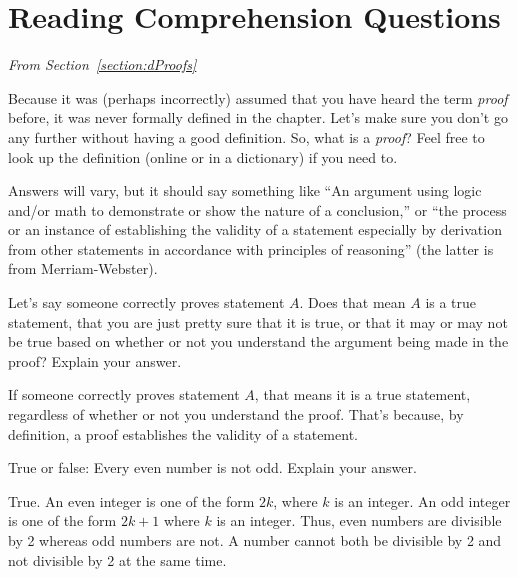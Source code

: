 \section{Reading Comprehension  Questions}

\noindent
{\em From Section~\ref{section:dProofs}}

\begin{requ}
Because it was (perhaps incorrectly) assumed that you have heard the term {\em proof} before, 
it was never formally defined in the chapter. Let's make sure you don't go any further without having a good definition.
So, what is a {\em proof}? Feel free to look up the definition (online or in a dictionary) if you need to.
\begin{requanswer}
Answers will vary, but it should say something like 
``An argument using logic and/or math to demonstrate or show the nature of a conclusion,''
or 
``the process or an instance of establishing the validity of a statement especially by derivation 
from other statements in accordance with principles of reasoning'' (the latter is from Merriam-Webster). 
\end{requanswer}
\end{requ}

\begin{requ}
Let's say someone correctly proves statement $A$. 
Does that mean $A$ is a true statement, that you are just pretty sure that it is true, 
or that it may or may not be true
based on whether or not you understand the argument being made in the proof? 
Explain your answer.
\begin{requanswer}
If someone correctly proves statement $A$, that means it is a true statement, regardless of whether or not
you understand the proof.  That's because, by definition, a proof establishes the validity of a statement.
\end{requanswer}
\end{requ}

\begin{requ}
True or false: Every even number is not odd. Explain your answer.
\begin{requanswer}
True. An even integer is one of the form $2k$, where $k$ is an integer. 
An odd integer is one of the form $2k + 1$ where $k$ is an integer. 
Thus, even numbers are divisible by 2 whereas odd numbers are not. 
A number cannot both be divisible by 2 and not divisible by 2 at the same time.
\end{requanswer}
\end{requ}

